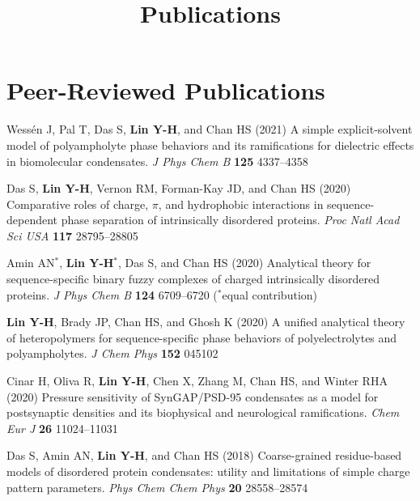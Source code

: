 \documentclass[11pt]{../yhlcv}
\def\tname#1{{\bf #1}}
\begin{document}
\title{Publications}

\maketitle

\raggedright


\section*{Peer-Reviewed Publications}

\begin{etaremune}[leftmargin=0.26in]\itemsep-0.2pt

\item 
Wessén J, Pal T, Das S, \tname{Lin Y-H}, and Chan HS (2021)
A simple explicit-solvent model of polyampholyte phase behaviors and its ramifications for dielectric effects in biomolecular condensates.
{\it J Phys Chem B} {\bf 125} 4337--4358 %

\item 
Das S, \tname{Lin Y-H}, Vernon RM, Forman-Kay JD, and Chan HS (2020)
Comparative roles of charge, $\pi$, and hydrophobic interactions in sequence-dependent phase separation of intrinsically disordered proteins.
{\it Proc Natl Acad Sci USA} {\bf 117} 28795--28805

\item 
Amin AN$^*$, \tname{Lin Y-H}$^*$, Das S, and Chan HS (2020)
Analytical theory for sequence-specific binary fuzzy complexes of charged intrinsically disordered proteins.
{\it J Phys Chem B} 
{\bf 124} 6709--6720
($^*$equal contribution) %

\item
\tname{Lin Y-H}, Brady JP, Chan HS, and Ghosh K (2020)
A unified analytical theory of heteropolymers for sequence-specific phase behaviors of polyelectrolytes and polyampholytes. 
{\it J Chem Phys} {\bf 152} 045102

\item
Cinar H, Oliva R, \tname{Lin Y-H}, Chen X, Zhang M, Chan HS, and Winter RHA (2020)
Pressure sensitivity of SynGAP/PSD-95 condensates as a model for postsynaptic densities and its biophysical and neurological ramifications. 
{\it Chem Eur J} {\bf 26} 11024--11031 %

\item 
Das S, Amin AN, \tname{Lin Y-H}, and Chan HS (2018)
Coarse-grained residue-based models of disordered protein condensates: 
utility and limitations of simple charge pattern parameters.
{\it Phys Chem Chem Phys} {\bf 20} 28558--28574 


\end{etaremune}
\end{document}
